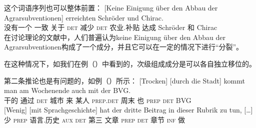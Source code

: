 这个词语序列也可以整体前置：
\ea
\gll {}[Keine Einigung über den Abbau der Agrarsubventionen] erreichten Schröder und Chirac.\\
     \spacebr{}没有一个 一致 关于 \textsc{det} 减少 \textsc{det} 农业.补贴  达成 Schröder 和 Chirac\\
\z
在讨论理论的文献中，人们普遍认为keine Einigung über den Abbau der Agrarsubventionen构成了一个成分，并且它可以在一定的情况下进行“分裂”。

\noindent
在这种情况下，如我们在例（）中看到的，次级组成成分是可以各自独立移位的。\citep{deKuthy2002a} 

第二条推论也是有问题的，如例（）所示：
\eal
\label{bsp-mehr-vf}
\ex\label{bsp-trocken-durch-die-stadt}
\gll {}[Trocken]       [durch        die          Stadt] kommt man am                       Wochenende auch mit der BVG.\footnotemark\\
       \spacebr{}干的 \spacebr{}通过 \textsc{det} 城市   来    某人 \textsc{prep}.\textsc{det} 周末 也 \textsc{prep} \textsc{det} BVG\\
\ex 
\gll {}[Wenig]     [mit Sprachgeschichte] hat der dritte Beitrag in dieser Rubrik zu tun, [\ldots]\footnotemark\\
       \spacebr{}少 \spacebr{}\textsc{prep} 语言.历史 \textsc{aux} \textsc{det} 第三 文章 \textsc{prep} \textsc{det} 章节 \textsc{inf} 做\\
\zl

